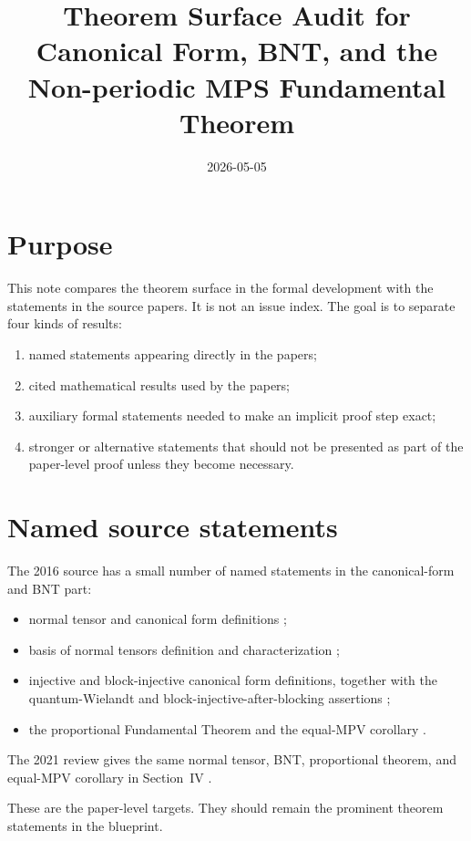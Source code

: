 \documentclass{article}
\title{Theorem Surface Audit for Canonical Form, BNT, and the Non-periodic MPS Fundamental Theorem}
\author{}
\date{2026-05-05}
\begin{document}
\maketitle

\section{Purpose}

This note compares the theorem surface in the formal development with the
statements in the source papers. It is not an issue index. The goal is to
separate four kinds of results:
\begin{enumerate}
  \item named statements appearing directly in the papers;
  \item cited mathematical results used by the papers;
  \item auxiliary formal statements needed to make an implicit proof step exact;
  \item stronger or alternative statements that should not be presented as part
        of the paper-level proof unless they become necessary.
\end{enumerate}

\section{Named source statements}

The 2016 source has a small number of named statements in the canonical-form
and BNT part:
\begin{itemize}
  \item normal tensor and canonical form definitions
    \cite[lines~233--255]{Cirac2016MPDO_arXiv};
  \item basis of normal tensors definition and characterization
    \cite[lines~271--280]{Cirac2016MPDO_arXiv};
  \item injective and block-injective canonical form definitions, together with
    the quantum-Wielandt and block-injective-after-blocking assertions
    \cite[lines~317--345]{Cirac2016MPDO_arXiv};
  \item the proportional Fundamental Theorem and the equal-MPV corollary
    \cite[lines~347--356]{Cirac2016MPDO_arXiv}.
\end{itemize}
The 2021 review gives the same normal tensor, BNT, proportional theorem, and
equal-MPV corollary in Section~IV
\cite[lines~1828--1899]{Cirac2021Matrix}.

These are the paper-level targets. They should remain the prominent theorem
statements in the blueprint.
\end{document}

